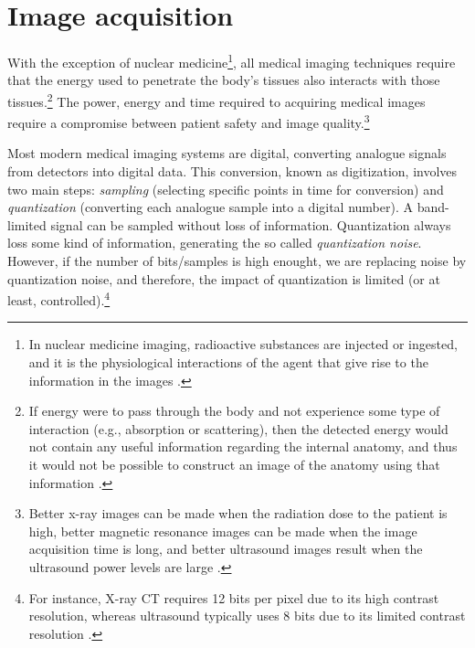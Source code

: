 \part{Image acquisition}

With the exception of nuclear medicine\footnote{In nuclear medicine
  imaging, radioactive substances are injected or ingested, and it is
  the physiological interactions of the agent that give rise to the
  information in the images \cite{bushberg2011essential}.}, all
medical imaging techniques require that the energy used to penetrate
the body’s tissues also interacts with those tissues.\footnote{If
  energy were to pass through the body and not experience some type of
  interaction (e.g., absorption or scattering), then the detected
  energy would not contain any useful information regarding the
  internal anatomy, and thus it would not be possible to construct an
  image of the anatomy using that information
  \cite{bushberg2011essential}.} The power, energy and time required
to acquiring medical images require a compromise between patient
safety and image quality.\footnote{Better x-ray images can be made
  when the radiation dose to the patient is high, better magnetic
  resonance images can be made when the image acquisition time is
  long, and better ultrasound images result when the ultrasound power
  levels are large \cite{bushberg2011essential}.}

Most modern medical imaging systems are digital, converting analogue
signals from detectors into digital data. This conversion, known as
digitization, involves two main steps: \emph{sampling} (selecting
specific points in time for conversion) and \emph{quantization}
(converting each analogue sample into a digital number). A
band-limited signal can be sampled without loss of
information. Quantization always loss some kind of information,
generating the so called \emph{quantization noise}. However, if the
number of bits/samples is high enought, we are replacing noise by
quantization noise, and therefore, the impact of quantization is
limited (or at least, controlled).\footnote{For instance, X-ray CT
  requires 12 bits per pixel due to its high contrast resolution,
  whereas ultrasound typically uses 8 bits due to its limited contrast
  resolution \cite{bushberg2011essential}.}
